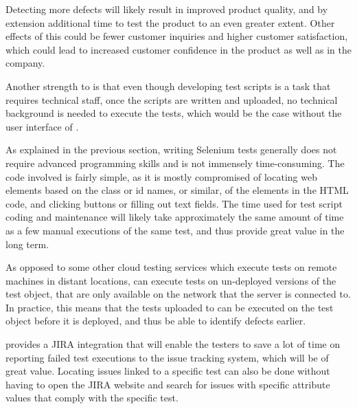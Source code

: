 Detecting more defects will likely result in improved product quality, and by extension additional time to test the product to an even greater extent. Other effects of this could be fewer customer inquiries and higher customer satisfaction, which could lead to increased customer confidence in the product as well as in the company.

Another strength to \toolname \space is that even though developing test scripts is a task that requires technical staff, once the scripts are written and uploaded, no technical background is needed to execute the tests, which would be the case without the user interface of \toolname.

As explained in the previous section, writing Selenium tests generally does not require advanced programming skills and is not immensely time-consuming. The code involved is fairly simple, as it is mostly compromised of locating web elements based on the class or id names, or similar, of the elements in the HTML code, and clicking buttons or filling out text fields. The time used for test script coding and maintenance will likely take approximately the same amount of time as a few manual executions of the same test, and thus provide great value in the long term.

As opposed to some other cloud testing services which execute tests on remote machines in distant locations, \toolname \space can execute tests on un-deployed versions of the test object, that are only available on the network that the \toolname \space server is connected to. In practice, this means that the tests uploaded to \toolname \space can be executed on the test object before it is deployed, and thus be able to identify defects earlier.

\toolname \space provides a JIRA integration that will enable the testers to save a lot of time on reporting failed test executions to the issue tracking system, which will be of great value. Locating issues linked to a specific test can also be done without having to open the JIRA website and search for issues with specific attribute values that comply with the specific test.










